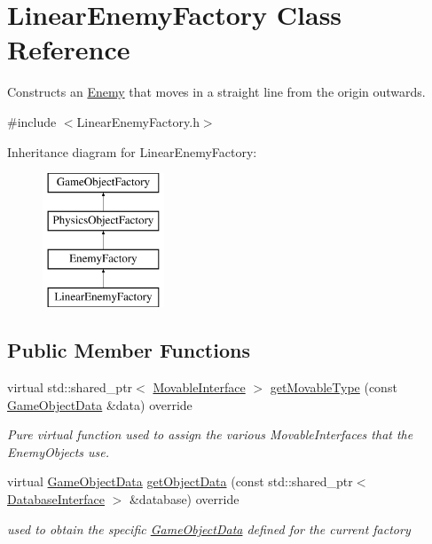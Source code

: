 \hypertarget{class_linear_enemy_factory}{}\section{Linear\+Enemy\+Factory Class Reference}
\label{class_linear_enemy_factory}


Constructs an \hyperlink{class_enemy}{Enemy} that moves in a straight line from the origin outwards.  




{\ttfamily \#include $<$Linear\+Enemy\+Factory.\+h$>$}

Inheritance diagram for Linear\+Enemy\+Factory\+:\begin{figure}[H]
\begin{center}
\leavevmode
\includegraphics[height=4.000000cm]{d4/d4f/class_linear_enemy_factory}
\end{center}
\end{figure}
\subsection*{Public Member Functions}
\begin{DoxyCompactItemize}
\item 
virtual std\+::shared\+\_\+ptr$<$ \hyperlink{class_movable_interface}{Movable\+Interface} $>$ \hyperlink{class_linear_enemy_factory_ad8b2931b7f31f9f8e13d3c9d804469bf}{get\+Movable\+Type} (const \hyperlink{struct_game_object_data}{Game\+Object\+Data} \&data) override
\begin{DoxyCompactList}\small\item\em Pure virtual function used to assign the various Movable\+Interfaces that the Enemy\+Objects use. \end{DoxyCompactList}\item 
virtual \hyperlink{struct_game_object_data}{Game\+Object\+Data} \hyperlink{class_linear_enemy_factory_a9d959b8a414e30ad4813d5d3740eafee}{get\+Object\+Data} (const std\+::shared\+\_\+ptr$<$ \hyperlink{class_database_interface}{Database\+Interface} $>$ \&database) override
\begin{DoxyCompactList}\small\item\em used to obtain the specific \hyperlink{struct_game_object_data}{Game\+Object\+Data} defined for the current factory \end{DoxyCompactList}\end{DoxyCompactItemize}



